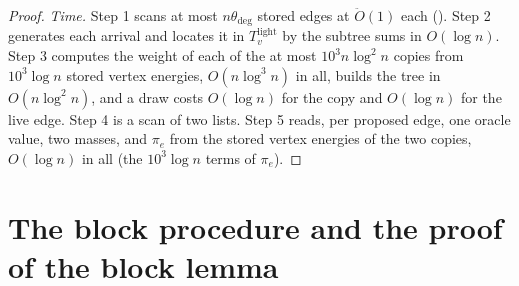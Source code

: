 \documentclass[11pt]{article}
\theoremstyle{remark}
\newcommand{\dheavy}{\theta_{\deg}}
\newcommand{\Odouble}{\ddot{O}}
\begin{document}
\begin{proof}
\emph{Time.}
Step 1 scans at most $n\dheavy$ stored edges at $\Odouble(1)$ each
().
Step 2 generates each arrival and locates it in $T^{\mathrm{light}}_v$ by the
subtree sums in $O(\log n)$.
Step 3 computes the weight of each of the at most $10^{3}n\log^{2}n$ copies
from $10^{3}\log n$ stored vertex energies, $O(n\log^{3}n)$ in all, builds the
tree in $O(n\log^{2}n)$, and a draw costs $O(\log n)$ for the copy and
$O(\log n)$ for the live edge.
Step 4 is a scan of two lists.
Step 5 reads, per proposed edge, one oracle value, two masses, and
$\pi_e$ from the stored vertex energies of the two copies, $O(\log n)$ in all
(the $10^{3}\log n$ terms of $\pi_e$).
\end{proof}

\section{The block procedure and the proof of the block lemma}\label{sec:proof}
\end{document}
